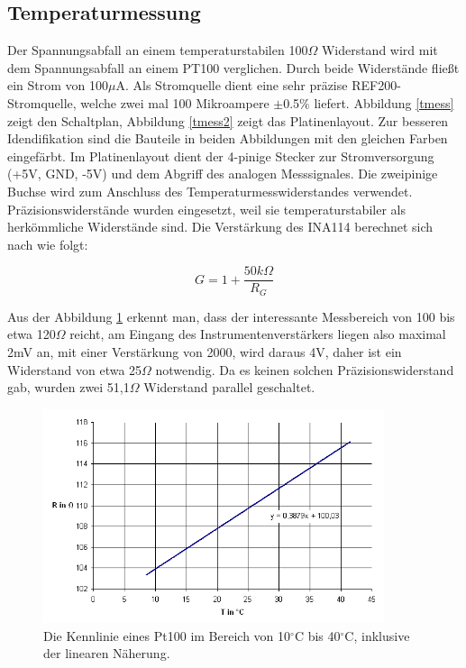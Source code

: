 \documentclass[a4paper,bibtotoc,oneside]{scrbook}
\begin{document}
\subsection{Temperaturmessung}\thispagestyle{empty}
Der Spannungsabfall an einem temperaturstabilen 100$\Omega$ Widerstand wird mit dem Spannungsabfall an einem PT100 verglichen. Durch beide Widerstände fließt ein Strom von 100$\mu$A. Als Stromquelle dient eine sehr präzise REF200-Stromquelle\cite{ref200}, welche zwei mal 100 Mikroampere $\pm$0.5$\%$ liefert. Abbildung \ref{tmess} zeigt den Schaltplan, Abbildung \ref{tmess2} zeigt das Platinenlayout. Zur besseren Idendifikation sind die Bauteile in beiden Abbildungen mit den gleichen Farben eingefärbt. 
Im Platinenlayout dient der 4-pinige Stecker zur Stromversorgung (+5V, GND, -5V) und dem Abgriff des analogen Messsignales. Die zweipinige Buchse wird zum Anschluss des Temperaturmesswiderstandes verwendet.
Präzisionswiderstände wurden eingesetzt, weil sie temperaturstabiler als herkömmliche Widerstände sind. 
Die Verstärkung des INA114 berechnet sich nach \cite{ina114} wie folgt:

\begin{equation}
 G = 1 + \frac{50k\Omega}{R_G}
\end{equation} 

Aus der Abbildung \ref{pt100} erkennt man, dass der interessante Messbereich von 100 bis etwa 120$\Omega$ reicht, am Eingang des Instrumentenverstärkers liegen also maximal 2mV an, mit einer Verstärkung von 2000, wird daraus 4V, daher ist ein Widerstand von etwa 25$\Omega$ notwendig. Da es keinen solchen Präzisionswiderstand gab, wurden zwei 51,1$\Omega$ Widerstand parallel geschaltet. 

\begin{figure}[htbp]
\centering
\includegraphics[width=100mm]{img/pt100.png}
\caption{Die Kennlinie eines Pt100 im Bereich von  	10$^{\circ}$C bis 40$^{\circ}$C, inklusive der linearen Näherung.}\label{pt100}
\end{figure}
\end{document}
